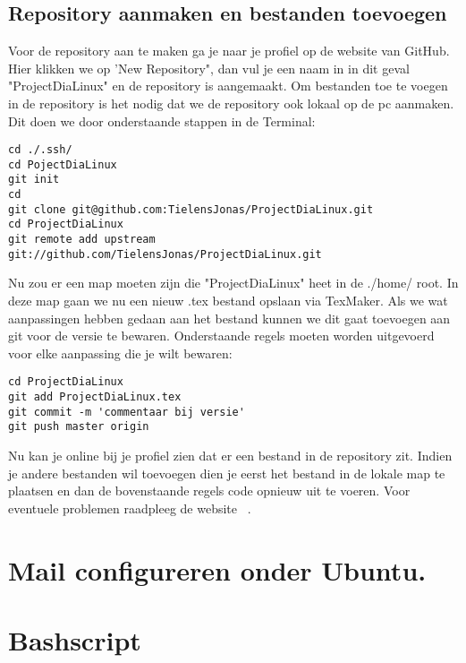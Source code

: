\documentclass[11pt]{report}
\begin{document}
\section{Repository aanmaken en bestanden toevoegen}
Voor de repository aan te maken ga je naar je profiel op de website van GitHub. Hier klikken we op 'New Repository", dan vul je een naam in in dit geval "ProjectDiaLinux" en de repository is aangemaakt.
Om bestanden toe te voegen in de repository is het nodig dat we de repository ook lokaal op de pc aanmaken. Dit doen we door onderstaande stappen in de Terminal:
\begin{lstlisting}
cd ./.ssh/
cd PojectDiaLinux
git init
cd
git clone git@github.com:TielensJonas/ProjectDiaLinux.git
cd ProjectDiaLinux
git remote add upstream git://github.com/TielensJonas/ProjectDiaLinux.git
\end{lstlisting}
Nu zou er een map moeten zijn die "ProjectDiaLinux" heet in de ./home/ root. In deze map gaan we nu een nieuw .tex bestand opslaan via TexMaker.
Als we wat aanpassingen hebben gedaan aan het bestand kunnen we dit gaat toevoegen aan git voor de versie te bewaren. 
Onderstaande regels moeten worden uitgevoerd voor elke aanpassing die je wilt bewaren:
\begin{lstlisting}
cd ProjectDiaLinux
git add ProjectDiaLinux.tex
git commit -m 'commentaar bij versie'
git push master origin
\end{lstlisting}
Nu kan je online bij je profiel zien dat er een bestand in de repository zit. Indien je andere bestanden wil toevoegen dien je eerst het bestand in de lokale map te plaatsen en dan de bovenstaande regels code opnieuw uit te voeren.
Voor eventuele problemen raadpleeg de website ~\cite{SiteGit}.
\newpage
\renewcommand{\appendixname}{Bijlage}
\chapter{Mail configureren onder Ubuntu.}
\newpage
\renewcommand{\appendixname}{Bijlage}
\chapter{Bashscript}
\newpage
\listoffigures
\listoftables
\printindex
 

\end{document}
